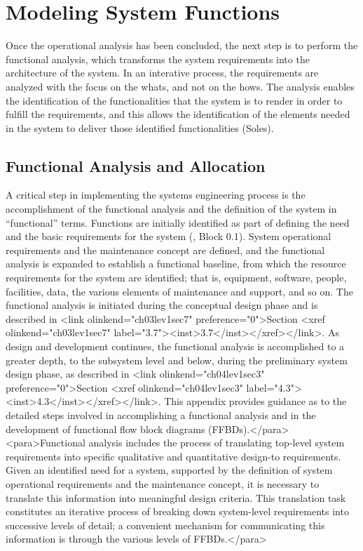 \section{Modeling System Functions}

Once the operational analysis has been concluded, the next step is to perform the functional analysis, which transforms the system requirements into the architecture of the system. In an interative process, the requirements are analyzed with the focus on the whats, and not on the hows. The analysis enables the identification of the functionalities that the system is to render in order to fulfill the requirements, and this allows the identification of the elements needed in the system to deliver those identified functionalities (Soles).

\subsection{Functional Analysis and Allocation}

A critical step in implementing the systems engineering process is the accomplishment of the functional analysis and the definition of the system in “functional” terms. Functions are initially identified as part of defining the need and the basic requirements for the system (, Block 0.1). System operational requirements and the maintenance concept are defined, and the functional analysis is expanded to establish a functional baseline, from which the resource requirements for the system are identified; that is, equipment, software, people, facilities, data, the various elements of maintenance and support, and so on. The functional analysis is initiated during the conceptual design phase and is described in <link olinkend="ch03lev1sec7" preference="0">Section <xref olinkend="ch03lev1sec7" label="3.7"><inst>3.7</inst></xref></link>. As design and development continues, the functional analysis is accomplished to a greater depth, to the subsystem level and below, during the preliminary system design phase, as described in <link olinkend="ch04lev1sec3" preference="0">Section <xref olinkend="ch04lev1sec3" label="4.3"><inst>4.3</inst></xref></link>. This appendix provides guidance as to the detailed steps involved in accomplishing a functional analysis and in the development of functional flow block diagrams (FFBDs).</para>
<para>Functional analysis includes the process of translating top-level system requirements into specific qualitative and quantitative design-to requirements. Given an identified need for a system, supported by the definition of system operational requirements and the maintenance concept, it is necessary to translate this information into meaningful design criteria. This translation task constitutes an iterative process of breaking down system-level requirements into successive levels of detail; a convenient mechanism for communicating this information is through the various levels of FFBDs.</para>


